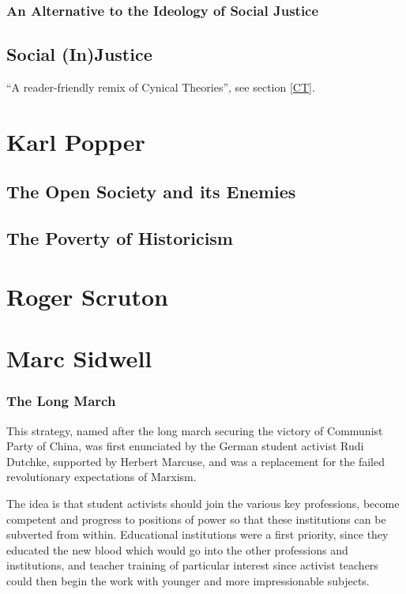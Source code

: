 \documentclass[10pt,titlepage]{book}
\begin{document}
\subsubsection{An Alternative to the Ideology of Social Justice}

\subsection{Social (In)Justice \cite{pluckrose-socinj}}\label{SI}

``A reader-friendly remix of Cynical Theories'', see section \ref{CT}.

\section{Karl Popper}

\subsection{The Open Society and its Enemies}

\cite{popperOSE1,popperOSE2}

\subsection{The Poverty of Historicism}

\cite{popperPOH}

\section{Roger Scruton}

\cite{scruton85,scruton15}


\section{Marc Sidwell}\label{Sidwell}

\subsubsection{The Long March \cite{sidwell-long}}

This strategy, named after the long march securing the victory of Communist Party of China, was first enunciated by the German student activist Rudi Dutchke, supported by Herbert Marcuse, and was a replacement for the failed revolutionary expectations of Marxism.

The idea is that student activists should join the various key professions, become competent and progress to positions of power so that these institutions can be subverted from within.
Educational institutions were a first priority, since they educated the new blood which would go into the other professions and institutions, and teacher training of particular interest since activist teachers could then begin the work with younger and more impressionable subjects.
\end{document}
